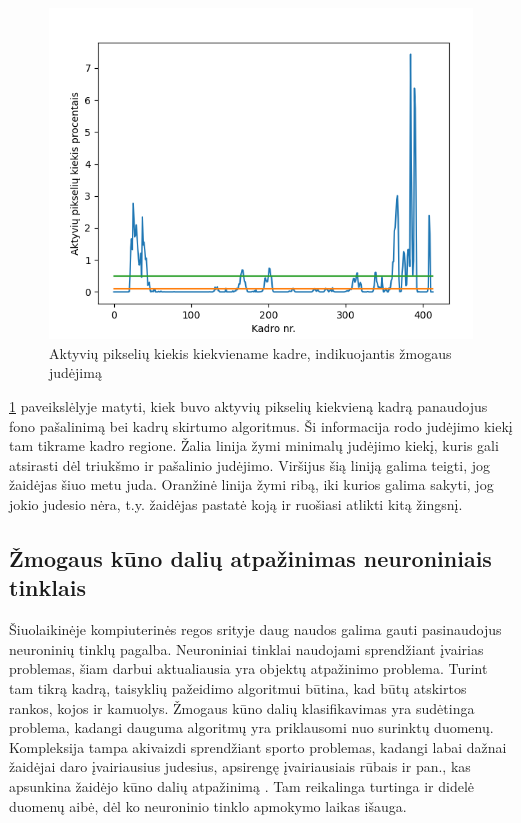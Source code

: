 \documentclass{VUMIFPSbakalaurinis}
\begin{document}
\begin{figure}[H]
    \centering
    \includegraphics[scale=0.8]{img/steps}
    \caption{Aktyvių pikselių kiekis kiekviename kadre, indikuojantis žmogaus judėjimą }
    \label{img:steps}
\end{figure}

\ref{img:steps} paveikslėlyje matyti, kiek buvo aktyvių pikselių kiekvieną kadrą panaudojus fono pašalinimą bei kadrų skirtumo algoritmus. Ši informacija rodo judėjimo kiekį tam tikrame kadro regione. Žalia linija žymi minimalų judėjimo kiekį, kuris gali atsirasti dėl triukšmo ir pašalinio judėjimo. Viršijus šią liniją galima teigti, jog žaidėjas šiuo metu juda. Oranžinė linija žymi ribą, iki kurios galima sakyti, jog jokio judesio nėra, t.y. žaidėjas pastatė koją ir ruošiasi atlikti kitą žingsnį. 

\subsection{Žmogaus kūno dalių atpažinimas neuroniniais tinklais}

Šiuolaikinėje kompiuterinės regos srityje daug naudos galima gauti pasinaudojus neuroninių tinklų pagalba. Neuroniniai tinklai naudojami sprendžiant įvairias problemas, šiam darbui aktualiausia yra objektų atpažinimo problema. Turint tam tikrą kadrą, taisyklių pažeidimo algoritmui būtina, kad būtų atskirtos rankos, kojos ir kamuolys. Žmogaus kūno dalių klasifikavimas yra sudėtinga problema, kadangi dauguma algoritmų yra priklausomi nuo surinktų duomenų. Kompleksija tampa akivaizdi sprendžiant sporto problemas, kadangi labai dažnai žaidėjai daro įvairiausius judesius, apsirengę įvairiausiais rūbais ir pan., kas apsunkina žaidėjo kūno dalių atpažinimą \cite{Andriluka_2014_CVPR}. Tam reikalinga turtinga ir didelė duomenų aibė, dėl ko neuroninio tinklo apmokymo laikas išauga. 
\end{document}
